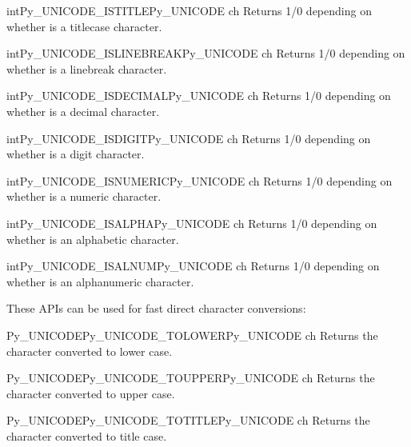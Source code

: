 \begin{cfuncdesc}{int}{Py_UNICODE_ISTITLE}{Py_UNICODE ch}
  Returns 1/0 depending on whether  is a titlecase character.
\end{cfuncdesc}

\begin{cfuncdesc}{int}{Py_UNICODE_ISLINEBREAK}{Py_UNICODE ch}
  Returns 1/0 depending on whether  is a linebreak character.
\end{cfuncdesc}

\begin{cfuncdesc}{int}{Py_UNICODE_ISDECIMAL}{Py_UNICODE ch}
  Returns 1/0 depending on whether  is a decimal character.
\end{cfuncdesc}

\begin{cfuncdesc}{int}{Py_UNICODE_ISDIGIT}{Py_UNICODE ch}
  Returns 1/0 depending on whether  is a digit character.
\end{cfuncdesc}

\begin{cfuncdesc}{int}{Py_UNICODE_ISNUMERIC}{Py_UNICODE ch}
  Returns 1/0 depending on whether  is a numeric character.
\end{cfuncdesc}

\begin{cfuncdesc}{int}{Py_UNICODE_ISALPHA}{Py_UNICODE ch}
  Returns 1/0 depending on whether  is an alphabetic
  character.
\end{cfuncdesc}

\begin{cfuncdesc}{int}{Py_UNICODE_ISALNUM}{Py_UNICODE ch}
  Returns 1/0 depending on whether  is an alphanumeric
  character.
\end{cfuncdesc}

These APIs can be used for fast direct character conversions:

\begin{cfuncdesc}{Py_UNICODE}{Py_UNICODE_TOLOWER}{Py_UNICODE ch}
  Returns the character  converted to lower case.
\end{cfuncdesc}

\begin{cfuncdesc}{Py_UNICODE}{Py_UNICODE_TOUPPER}{Py_UNICODE ch}
  Returns the character  converted to upper case.
\end{cfuncdesc}

\begin{cfuncdesc}{Py_UNICODE}{Py_UNICODE_TOTITLE}{Py_UNICODE ch}
  Returns the character  converted to title case.
\end{cfuncdesc}


